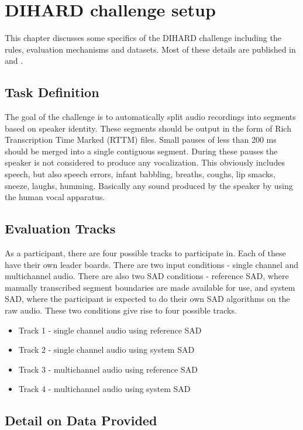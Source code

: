 \chapter{DIHARD challenge setup}

This chapter discusses some specifics of the DIHARD challenge including the rules, evaluation mechanisms and datasets. Most of these details are published in \cite{ryant2019second} and \cite{ryant2019second2}.

\section{Task Definition}
The goal of the challenge is to automatically split audio recordings into segments based on speaker identity. These segments should be output in the form of Rich Transcription Time Marked (RTTM) files. Small pauses of less than 200 ms should be merged into a single contiguous segment. During these pauses the speaker is not considered to produce any vocalization. This obviously includes speech, but also speech errors, infant babbling, breaths, coughs, lip smacks, sneeze, laughs, humming. Basically any sound produced by the speaker by using the human vocal apparatus.

\section{Evaluation Tracks}
As a participant, there are four possible tracks to participate in. Each of these have their own leader boards. There are two input conditions - single channel and multichannel audio. There are also two SAD conditions - reference SAD, where manually transcribed segment boundaries are made available for use, and system SAD, where the participant is expected to do their own SAD algorithms on the raw audio. These two conditions give rise to four possible tracks.

\begin{itemize}
	\item Track 1 - single channel audio using reference SAD
	\item Track 2 - single channel audio using system SAD
	\item Track 3 - multichannel audio using reference SAD
	\item Track 4 - multichannel audio using system SAD
\end{itemize}

\section{Detail on Data Provided}

